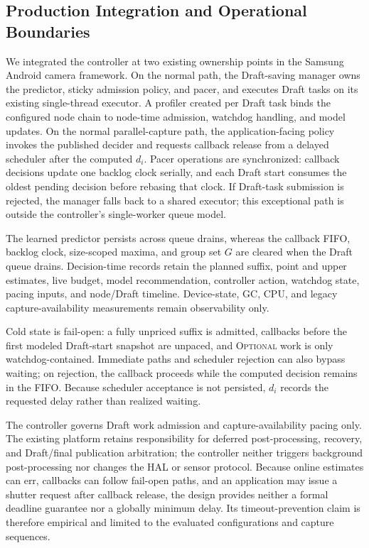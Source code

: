 \subsection{Production Integration and Operational Boundaries}
\label{sec:implementation}

We integrated the controller at two existing ownership points in the Samsung Android camera framework.
On the normal path, the Draft-saving manager owns the predictor, sticky admission policy, and pacer, and executes Draft tasks on its existing single-thread executor.
A profiler created per Draft task binds the configured node chain to node-time admission, watchdog handling, and model updates.
On the normal parallel-capture path, the application-facing policy invokes the published decider and requests callback release from a delayed scheduler after the computed \(d_i\).
Pacer operations are synchronized: callback decisions update one backlog clock serially, and each Draft start consumes the oldest pending decision before rebasing that clock.
If Draft-task submission is rejected, the manager falls back to a shared executor; this exceptional path is outside the controller's single-worker queue model.

The learned predictor persists across queue drains, whereas the callback FIFO, backlog clock, size-scoped maxima, and group set \(G\) are cleared when the Draft queue drains.
Decision-time records retain the planned suffix, point and upper estimates, live budget, model recommendation, controller action, watchdog state, pacing inputs, and node/Draft timeline.
Device-state, GC, CPU, and legacy capture-availability measurements remain observability only.

Cold state is fail-open: a fully unpriced suffix is admitted, callbacks before the first modeled Draft-start snapshot are unpaced, and \textsc{Optional} work is only watchdog-contained.
Immediate paths and scheduler rejection can also bypass waiting; on rejection, the callback proceeds while the computed decision remains in the FIFO.
Because scheduler acceptance is not persisted, \(d_i\) records the requested delay rather than realized waiting.

The controller governs Draft work admission and capture-availability pacing only.
The existing platform retains responsibility for deferred post-processing, recovery, and Draft/final publication arbitration; the controller neither triggers background post-processing nor changes the HAL or sensor protocol.
Because online estimates can err, callbacks can follow fail-open paths, and an application may issue a shutter request after callback release, the design provides neither a formal deadline guarantee nor a globally minimum delay.
Its timeout-prevention claim is therefore empirical and limited to the evaluated configurations and capture sequences.
